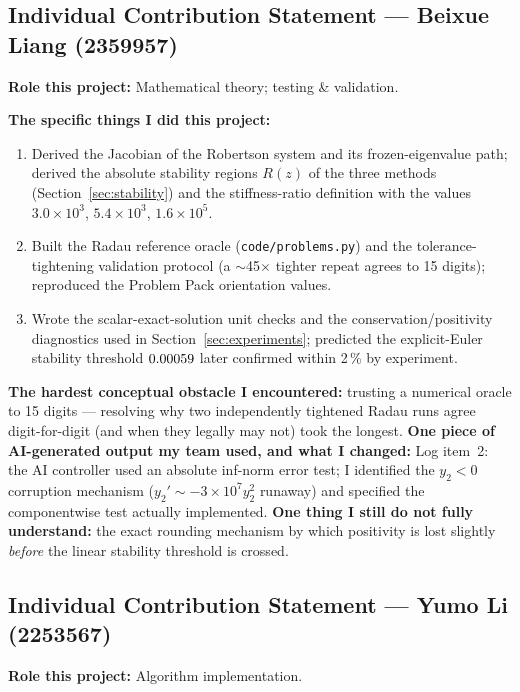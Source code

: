 ﻿\documentclass[11pt,a4paper]{article}
\begin{document}
\medskip
\subsection*{Individual Contribution Statement --- Beixue Liang (2359957)}
\textbf{Role this project:} Mathematical theory; testing \& validation.

\textbf{The specific things I did this project:}
\begin{enumerate}[leftmargin=2em,itemsep=1pt]
\item Derived the Jacobian of the Robertson system and its frozen-eigenvalue
  path; derived the absolute stability regions $R(z)$ of the three methods
  (Section~\ref{sec:stability}) and the stiffness-ratio definition with the
  values $3.0\times10^{3}$, $5.4\times10^{3}$, $1.6\times10^{5}$.
\item Built the Radau reference oracle (\texttt{code/problems.py}) and the
  tolerance-tightening validation protocol (a $\sim$45$\times$ tighter repeat
  agrees to 15 digits); reproduced the Problem Pack orientation values.
\item Wrote the scalar-exact-solution unit checks and the
  conservation/positivity diagnostics used in
  Section~\ref{sec:experiments}; predicted the explicit-Euler stability
  threshold $0.00059$ later confirmed within 2\,\% by experiment.
\end{enumerate}
\textbf{The hardest conceptual obstacle I encountered:} trusting a numerical
oracle to 15 digits --- resolving why two independently tightened Radau runs
agree digit-for-digit (and when they legally may not) took the longest.
\textbf{One piece of AI-generated output my team used, and what I changed:}
Log item~2: the AI controller used an absolute inf-norm error test; I
identified the $y_2<0$ corruption mechanism ($y_2'\sim-3\times10^{7}y_2^{2}$
runaway) and specified the componentwise test actually implemented.
\textbf{One thing I still do not fully understand:} the exact rounding
mechanism by which positivity is lost slightly \emph{before} the linear
stability threshold is crossed.

\medskip
\subsection*{Individual Contribution Statement --- Yumo Li (2253567)}
\textbf{Role this project:} Algorithm implementation.
\end{document}
